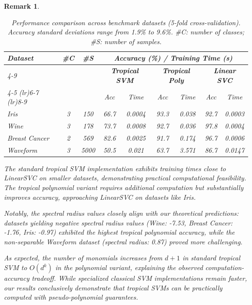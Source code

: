 \documentclass{article}
\newtheorem{remark}{Remark}
\begin{document}
\begin{remark}
\begin{table}[h]
\centering
\footnotesize
\begin{tabular}{@{}l@{\hskip 4pt}c@{\hskip 4pt}c@{\hskip 8pt}cc@{\hskip 8pt}cc@{\hskip 8pt}cc@{}}
\toprule
\multirow{3}{*}{\textbf{Dataset}} & \multirow{3}{*}{\textbf{\#C}} & \multirow{3}{*}{\textbf{\#S}} & \multicolumn{6}{c}{\textbf{Accuracy (\%) / Training Time (s)}} \\
\cmidrule(lr){4-9}
& & & \multicolumn{2}{c}{\textbf{Tropical SVM}} & \multicolumn{2}{c}{\textbf{Tropical Poly}} & \multicolumn{2}{c}{\textbf{Linear SVC}} \\
\cmidrule(lr){4-5} \cmidrule(lr){6-7} \cmidrule(lr){8-9}
& & & Acc & Time & Acc & Time & Acc & Time \\
\midrule
Iris & 3 & 150 & 66.7 & 0.0004 & 93.3 & 0.038 & 92.7 & 0.0003 \\
Wine & 3 & 178 & 73.7 & 0.0008 & 92.7 & 0.036 & 97.8 & 0.0004 \\
Breast Cancer & 2 & 569 & 82.6 & 0.0025 & 91.7 & 0.174 & 96.7 & 0.0006 \\
Waveform & 3 & 5000 & 50.5 & 0.021 & 63.7 & 3.571 & 86.7 & 0.0147 \\
\bottomrule
\end{tabular}
\vspace{0.5em}
\caption{Performance comparison across benchmark datasets (5-fold cross-validation). Accuracy standard deviations range from 1.9\% to 9.6\%. \#C: number of classes; \#S: number of samples.}
\label{tab:benchmark_results}
\end{table}

The standard tropical SVM implementation exhibits training times close to LinearSVC on smaller datasets, demonstrating practical computational feasibility. The tropical polynomial variant requires additional computation but substantially improves accuracy, approaching LinearSVC on datasets like Iris.

Notably, the spectral radius values closely align with our theoretical predictions: datasets yielding negative spectral radius values (Wine: -7.53, Breast Cancer: -1.76, Iris: -0.97) exhibited the highest tropical polynomial accuracy, while the non-separable Waveform dataset (spectral radius: 0.87) proved more challenging.

As expected, the number of monomials increases from $d+1$ in standard tropical SVM to $O(d^k)$ in the polynomial variant, explaining the observed computation-accuracy tradeoff. While specialized classical SVM implementations remain faster, our results conclusively demonstrate that tropical SVMs can be practically computed with pseudo-polynomial guarantees.


\end{remark}
\end{document}
